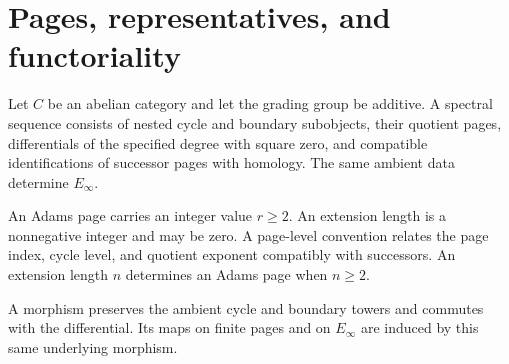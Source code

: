 

\section{Pages, representatives, and functoriality}

\begin{definition}
\label{sem:SpectralSequence:sequence}
Let $C$ be an abelian category and let the grading group be additive. A spectral sequence consists of nested cycle and boundary subobjects, their quotient pages, differentials of the specified degree with square zero, and compatible identifications of successor pages with homology. The same ambient data determine $E_\infty$.
\end{definition}

\begin{definition}
\label{sem:SpectralSequence:indices}
An Adams page carries an integer value $r\geq2$. An extension length is a nonnegative integer and may be zero. A page-level convention relates the page index, cycle level, and quotient exponent compatibly with successors. An extension length $n$ determines an Adams page when $n\geq2$.
\end{definition}

\begin{definition}
\label{sem:SpectralSequence:morphism}
A morphism preserves the ambient cycle and boundary towers and commutes with the differential. Its maps on finite pages and on $E_\infty$ are induced by this same underlying morphism.
\end{definition}

